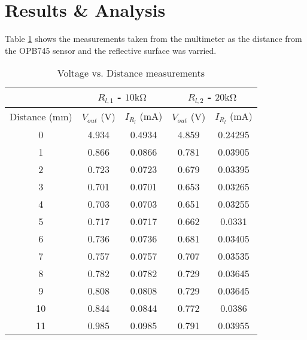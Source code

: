 \documentclass[CMPE]{KGCOEReport}
\begin{document}
\section{Results \& Analysis}

Table \ref{tbl:circuit1} shows the measurements taken from the multimeter as the distance
from the OPB745 sensor and the reflective surface was varried.

\begin{table}[H]
	\caption{Voltage vs. Distance measurements}
	\label{tbl:circuit1}
	\centering
	\begin{tabular}{|c|c|c|c|c|}
		\hline
		& \multicolumn{2}{c|}{$R_{l,1}$ - $10\si{\kilo\ohm}$} & \multicolumn{2}{c|}{$R_{l,2}$ - $20\si{\kilo\ohm}$} \\ \hline
		Distance ($\si{\milli\meter}$) & $V_{out}$ ($\si\volt$)       & $I_{R_l}$ ($\si{\milli\ampere}$)      & $V_{out}$ ($\si\volt$)       & $I_{R_l}$ ($\si{\milli\ampere}$)      \\ \hline
		0             & 4.934          & 0.4934        & 4.859          & 0.24295       \\ \hline
		1             & 0.866          & 0.0866        & 0.781          & 0.03905       \\ \hline
		2             & 0.723          & 0.0723        & 0.679          & 0.03395       \\ \hline
		3             & 0.701          & 0.0701        & 0.653          & 0.03265       \\ \hline
		4             & 0.703          & 0.0703        & 0.651          & 0.03255       \\ \hline
		5             & 0.717          & 0.0717        & 0.662          & 0.0331        \\ \hline
		6             & 0.736          & 0.0736        & 0.681          & 0.03405       \\ \hline
		7             & 0.757          & 0.0757        & 0.707          & 0.03535       \\ \hline
		8             & 0.782          & 0.0782        & 0.729          & 0.03645       \\ \hline
		9             & 0.808          & 0.0808        & 0.729          & 0.03645       \\ \hline
		10            & 0.844          & 0.0844        & 0.772          & 0.0386        \\ \hline
		11            & 0.985          & 0.0985        & 0.791          & 0.03955       \\ \hline

\end{tabular}
\end{table}
\end{document}
